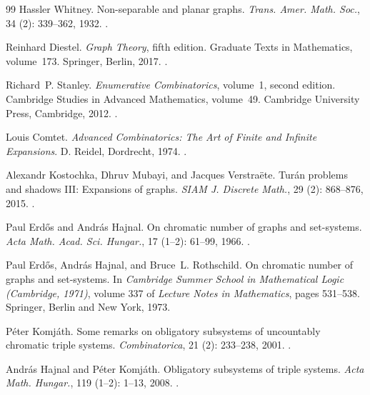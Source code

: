 \documentclass[a4paper,11pt,reqno]{amsart}
\theoremstyle{plain}
\theoremstyle{definition}
\theoremstyle{remark}
\begin{document}
\begin{thebibliography}{99}
Hassler Whitney.
\newblock Non-separable and planar graphs.
\newblock \emph{Trans. Amer. Math. Soc.}, 34 (2):
  339--362, 1932.
\newblock {}.

Reinhard Diestel.
\newblock \emph{Graph Theory}, fifth edition.
\newblock Graduate Texts in Mathematics, volume~173. Springer, Berlin,
  2017.
\newblock {}.

Richard~P. Stanley.
\newblock \emph{Enumerative Combinatorics}, volume~1, second edition.
\newblock Cambridge Studies in Advanced Mathematics, volume~49. Cambridge
  University Press, Cambridge, 2012.
\newblock {}.

Louis Comtet.
\newblock \emph{Advanced Combinatorics: The Art of Finite and Infinite Expansions}.
\newblock D. Reidel, Dordrecht, 1974.
\newblock {}.

Alexandr Kostochka, Dhruv Mubayi, and Jacques Verstra{\"e}te.
\newblock Tur{\'a}n problems and shadows III: Expansions of graphs.
\newblock \emph{SIAM J. Discrete Math.}, 29 (2): 868--876, 2015.
\newblock {}.

Paul Erd{\H{o}}s and Andr{\'a}s Hajnal.
\newblock On chromatic number of graphs and set-systems.
\newblock \emph{Acta Math. Acad. Sci. Hungar.}, 17
  (1--2): 61--99, 1966.
\newblock {}.

Paul Erd{\H{o}}s, Andr{\'a}s Hajnal, and Bruce~L. Rothschild.
\newblock On chromatic number of graphs and set-systems.
\newblock In \emph{Cambridge Summer School in Mathematical Logic (Cambridge,
  1971)}, volume 337 of \emph{Lecture Notes in Mathematics}, pages 531--538.
  Springer, Berlin and New York, 1973.

P{\'e}ter Komj{\'a}th.
\newblock Some remarks on obligatory subsystems of uncountably chromatic triple
  systems.
\newblock \emph{Combinatorica}, 21 (2): 233--238, 2001.
\newblock {}.

Andr{\'a}s Hajnal and P{\'e}ter Komj{\'a}th.
\newblock Obligatory subsystems of triple systems.
\newblock \emph{Acta Math. Hungar.}, 119 (1--2):
  1--13, 2008.
\newblock {}.


\end{thebibliography}
\end{document}
